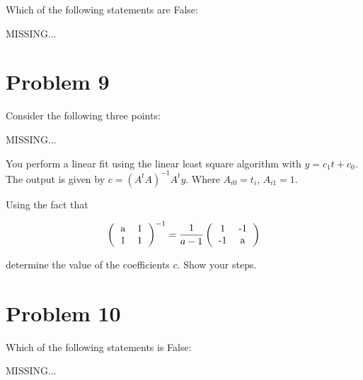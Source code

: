 \documentclass[12pt]{article}
\begin{document}
\noindent Which of the following statements are False:

MISSING...

\section{Problem 9}

\noindent Consider the following three points:

MISSING...

\noindent You perform a linear fit using the linear least square algorithm with $y = c_1 t + c_0$. The output is given by $c = (A^t A)^{-1} A^t y$. Where $A_{i0} = t_i$, $A_{i1}=1$.

\noindent Using the fact that 

\[
\left( \begin{tabular}{cc} a & 1\\ 1 & 1\end{tabular}\right)^{-1} = \frac1{a-1}
\left( \begin{tabular}{cc} 1 & -1\\ -1 & a\end{tabular}\right)
\]

\noindent determine the value of the coefficients $c$. Show your steps.

\section{Problem 10}

\noindent Which of the following statements is False:

MISSING...
\end{document}
